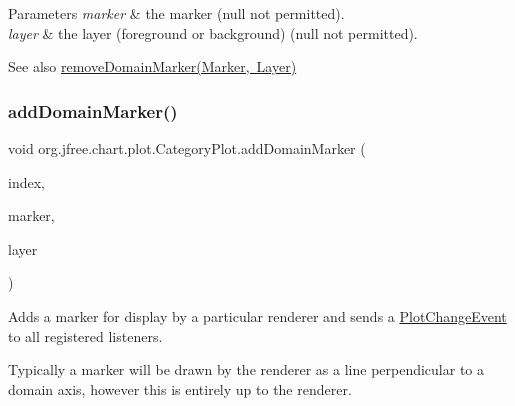 \begin{DoxyParams}{Parameters}
{\em marker} & the marker ({\ttfamily null} not permitted). \\
\hline
{\em layer} & the layer (foreground or background) ({\ttfamily null} not permitted).\\
\hline
\end{DoxyParams}
\begin{DoxySeeAlso}{See also}
\mbox{\hyperlink{classorg_1_1jfree_1_1chart_1_1plot_1_1_category_plot_a215d9c4db6ebf44f951eb29dac9dcced}{remove\+Domain\+Marker(\+Marker, Layer)}} 
\end{DoxySeeAlso}
\mbox{\label{classorg_1_1jfree_1_1chart_1_1plot_1_1_category_plot_a52edd66f5b4591450ec05edae8ff0be4}} 
\subsubsection{\texorpdfstring{add\+Domain\+Marker()}{addDomainMarker()}\hspace{0.1cm}{\footnotesize\ttfamily [3/4]}}
{\footnotesize\ttfamily void org.\+jfree.\+chart.\+plot.\+Category\+Plot.\+add\+Domain\+Marker (\begin{DoxyParamCaption}\item[{int}]{index,  }\item[{\mbox{\hyperlink{classorg_1_1jfree_1_1chart_1_1plot_1_1_category_marker}{Category\+Marker}}}]{marker,  }\item[{Layer}]{layer }\end{DoxyParamCaption})}

Adds a marker for display by a particular renderer and sends a \mbox{\hyperlink{}{Plot\+Change\+Event}} to all registered listeners. 

Typically a marker will be drawn by the renderer as a line perpendicular to a domain axis, however this is entirely up to the renderer.


